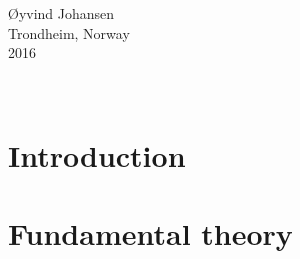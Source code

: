 \documentclass[12pt, a4paper, twoside, openright]{article}		%
\let\oldsection\section
\def\section{\cleardoublepage\oldsection}
\newcommand\blankpage{%
    \null
    \thispagestyle{empty}%
    \addtocounter{page}{-1}%
    \newpage}
\renewcommand{\d}[1]{\ensuremath{\operatorname{d}\!{#1}}}
\numberwithin{equation}{section}
\begin{document}
\begin{minipage}{0.95\textwidth}
\begin{flushright}
\O yvind Johansen \\
Trondheim, Norway \\ 
2016
\end{flushright}
\end{minipage}\\[4cm]

\newpage

\tableofcontents

\newpage
\afterpage{\blankpage}


\section{Introduction}

\section{Fundamental theory}
\end{document}
